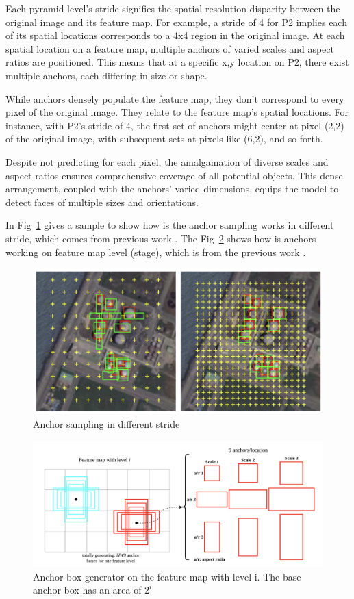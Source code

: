 \documentclass{article}
\begin{document}
Each pyramid level's stride signifies the spatial resolution disparity between the original image and its feature map. For example, a stride of 4 for P2 implies each of its spatial locations corresponds to a 4x4 region in the original image. At each spatial location on a feature map, multiple anchors of varied scales and aspect ratios are positioned. This means that at a specific x,y location on P2, there exist multiple anchors, each differing in size or shape.

While anchors densely populate the feature map, they don't correspond to every pixel of the original image. They relate to the feature map's spatial locations. For instance, with P2's stride of 4, the first set of anchors might center at pixel (2,2) of the original image, with subsequent sets at pixels like (6,2), and so forth.

Despite not predicting for each pixel, the amalgamation of diverse scales and aspect ratios ensures comprehensive coverage of all potential objects. This dense arrangement, coupled with the anchors' varied dimensions, equips the model to detect faces of multiple sizes and orientations.

In Fig~\ref{fig:anochor_tiling_1} gives a sample to show how is the anchor sampling works in different stride, which comes from previous work \cite{yan2019iou}.
The Fig~\ref{fig:anochor_tiling_2} shows how is anchors working on feature map level (stage), which is from the previous work \cite{vo2022review}.

\begin{figure}[h]
  \centering
  \includegraphics[width=0.7\linewidth]{images/anochor_tiling_1}
  \caption{Anchor sampling in different stride}
  \label{fig:anochor_tiling_1}
\end{figure}

\begin{figure}[h]
  \centering
  \includegraphics[width=0.7\linewidth]{images/anochor_tiling_2}
  \caption{Anchor box generator on the feature map with level i. The base anchor box has an area of $2^i$}
  \label{fig:anochor_tiling_2}
\end{figure}
\end{document}
